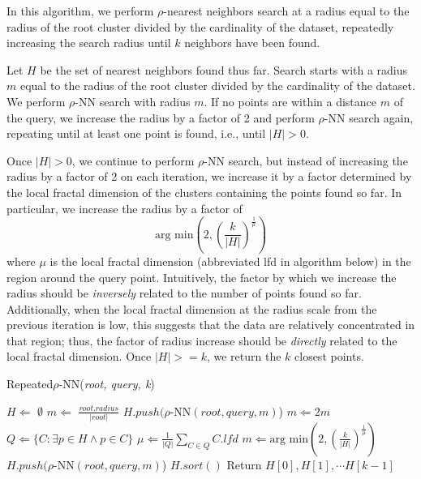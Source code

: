 In this algorithm, we perform $\rho$-nearest neighbors search at a radius equal to the radius of the root cluster divided by
the cardinality of the dataset, repeatedly increasing the search radius until $k$ neighbors
have been found.

Let $H$ be the set of nearest neighbors found thus far.
Search starts with a radius $m$ equal to the radius of the root cluster divided by
the cardinality of the dataset. We perform $\rho$-NN search with radius $m$. 
If no points are within a distance $m$ of the query, we increase the radius by a factor of 
2 and perform $\rho$-NN search again, repeating until at least one point is found, i.e., 
until $|H| > 0$.


Once $|H| > 0$, we continue to perform $\rho$-NN search, but instead of 
increasing the radius by a factor of 2 on each iteration, we increase it by a factor determined 
by the local fractal dimension of the clusters containing the points found so far. In particular, 
we increase the radius by a factor of 
\begin{equation} \text{arg min}\left(2, \left({\frac{k}{|H|}}\right)^{\frac{1}{\mu}}\right) \label{2} \end{equation}
where $\mu$ is the local fractal dimension (abbreviated lfd in algorithm below) in the region around the query point.
Intuitively, the factor by which we increase the radius should be \emph{inversely} related to the number of points found so far. 
Additionally, when the local fractal dimension at the radius scale from the previous iteration is low, this suggests that the data 
are relatively concentrated in that region; thus, the factor of radius increase should be \emph{directly} related to the 
local fractal dimension. Once $|H| >= k$, we return the $k$ closest points.

\begin{algorithm} %
    \caption{Repeated$\rho$-NN(\emph{root, query, k})} %
    \label{alg:knn-by-rnn} %
    \begin{algorithmic}[4] %
        \STATE $H \Leftarrow$ $\emptyset$
        \STATE $m \Leftarrow$ $\frac{root.radius}{|root|}$
            \STATE $H.push(\rho$-NN$(root, query, m)$)
            \STATE $m \Leftarrow 2m$
        \ENDWHILE
            \STATE $Q \Leftarrow \{ C: \exists p \in H \land p \in C \}$
            \STATE $\mu \Leftarrow \frac{1}{|Q|} \sum_{C \in Q} C.lfd$
            \STATE $m \Leftarrow \text{arg min}\left(2, \left({\frac{k}{|H|}}\right)^{\frac{1}{\mu}}\right)$
            \STATE $H.push(\rho$-NN$(root, query, m)$)
        \ENDWHILE
        \STATE $H.sort()$
        \STATE Return $H[0], H[1], \cdots H[k-1]$
    \end{algorithmic}
    \end{algorithm}


